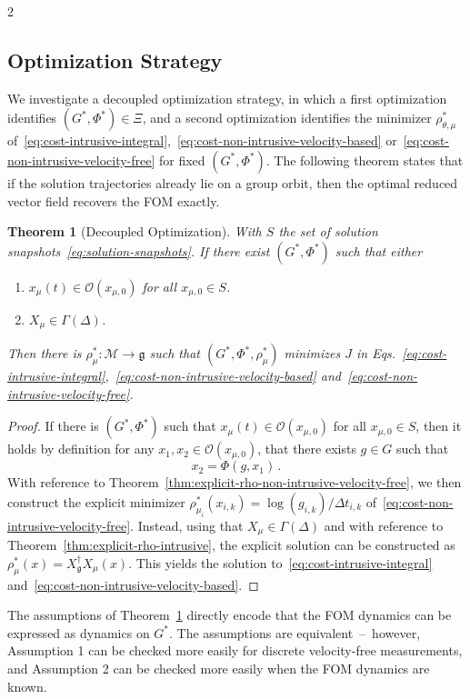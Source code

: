 \documentclass{article}
\newtheorem{theorem}{Theorem}[section]
\newtheorem{proof}{Proof}[theorem]
\newcommand{\M}{\mathcal{M}}                                %
\newcommand{\g}{\mathfrak{g}}                               %
\newcommand{\state}{x}
\begin{document}
\begin{multicols}{2}
\subsection{Optimization Strategy}
We investigate a decoupled optimization strategy, in which a first optimization identifies $(G^*,\Phi^*)\in \Xi$, and a second optimization identifies the minimizer $\rho^*_{\theta,\mu}$ of~\eqref{eq:cost-intrusive-integral},~\eqref{eq:cost-non-intrusive-velocity-based} or~\eqref{eq:cost-non-intrusive-velocity-free} for fixed $(G^*,\Phi^*)$. The following theorem states that if the solution trajectories already lie on a group orbit, then the optimal reduced vector field recovers the FOM exactly.

\begin{theorem}[Decoupled Optimization]\label{thm:decoupled_optimization}
    With $S$ the set of solution snapshots~\eqref{eq:solution-snapshots}. If there exist $(G^*,\Phi^*)$ such that either 
    \begin{enumerate}
        \item $\state_\mu(t) \in \mathcal{O}(\state_{\mu,0})$ for all $\state_{\mu,0} \in S$.
        \item $X_\mu \in \Gamma(\Delta)$.
    \end{enumerate} 
    Then there is $\rho^*_{\mu}:\M\rightarrow\g$ such that $(G^*,\Phi^*,\rho^*_\mu)$ minimizes $J$ in Eqs.~\eqref{eq:cost-intrusive-integral},~\eqref{eq:cost-non-intrusive-velocity-based} and~\eqref{eq:cost-non-intrusive-velocity-free}.
\end{theorem}
\begin{proof}
    If there is $(G^*,\Phi^*)$ such that $\state_\mu(t) \in \mathcal{O}(\state_{\mu,0})$ for all $\state_{\mu,0} \in S$, then it holds by definition for any $\state_1, \state_2 \in \mathcal{O}(\state_{\mu,0})$, that there exists $g \in G$ such that 
    \begin{equation}
        \state_2 = \Phi(g,\state_1)\,.
    \end{equation}
    With reference to Theorem~\ref{thm:explicit-rho-non-intrusive-velocity-free}, we then construct the explicit minimizer $\rho^*_{\mu_i}(\state_{i,k}) = \log(g_{i,k} )/ \Delta t_{i,k}$ of~\eqref{eq:cost-non-intrusive-velocity-free}. Instead, using that $X_\mu \in \Gamma(\Delta)$ and with reference to Theorem~\ref{thm:explicit-rho-intrusive}, the explicit solution can be constructed as $\rho_\mu^*(\state) = X^\dagger_\g X_\mu(\state)$. This yields the solution to~\eqref{eq:cost-intrusive-integral} and~\eqref{eq:cost-non-intrusive-velocity-based}.
\end{proof}
The assumptions of Theorem~\ref{thm:decoupled_optimization} directly encode that the FOM dynamics can be expressed as dynamics on $G^*$. The assumptions are equivalent~--~however, Assumption 1 can be checked more easily for discrete velocity-free measurements, and Assumption 2 can be checked more easily when the FOM dynamics are known.


\end{multicols}
\end{document}
